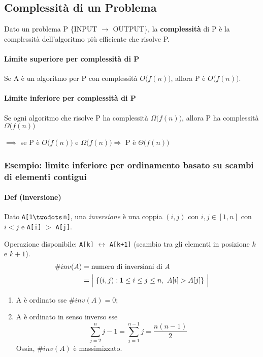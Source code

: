 \subsection{Complessità di un Problema}
Dato un problema P \{INPUT $\rightarrow$ OUTPUT\}, la \textbf{complessità} di P è la 
complessità dell'algoritmo più efficiente che risolve P.

\paragraph{Limite superiore per complessità di P} Se A è un algoritmo per P con
complessità  $O \big( f(n) \big)$, allora P è $O \big( f(n) \big)$.

\paragraph{Limite inferiore per complessità di P}
Se ogni algoritmo che risolve P ha complessità $\Omega \big( f(n) \big)$, allora 
P ha complessità $\Omega \big( f(n) \big)$
\bigskip

$\implies$ se P è $O \big( f(n) \big)$ e $\Omega \big( f(n) \big) \Rightarrow$ P è $\Theta \big( f(n) \big)$ 

\subsubsection{Esempio: limite inferiore per ordinamento basato su scambi di elementi contigui}

\paragraph{Def (inversione)} Dato \texttt{A[1$\twodots$n]}, una \emph{inversione} è una coppia $(i,j)$
con $i,j \in [1,n]$ con $i < j$ e \texttt{A[i]} $>$ \texttt{A[j]}.\par \medskip
Operazione disponibile: \texttt{A[k]} $\leftrightarrow$ \texttt{A[k+1]} (scambio tra gli elementi in posizione
$k$ e $k+1$).
\begin{align*}
	\# inv(A) & = \text{numero di inversioni di } A \\
	& = \Big{\vert} \ \{ (i,j) : 1 \leq i \leq j \leq n, \ A[i] > A[j] \} \ \Big{\vert}
\end{align*}

\begin{enumerate}
	\item A è ordinato sse $\# inv(A) = 0$;
	\item A è ordinato in senso inverso sse 
	\begin{displaymath}
		\displaystyle\sum_{j=2}^{n}j-1 = \displaystyle\sum_{j=1}^{n-1}j = \frac{n(n-1)}{2}
	\end{displaymath}
	Ossia, $\# inv(A)$ è massimizzato.
\end{enumerate}

